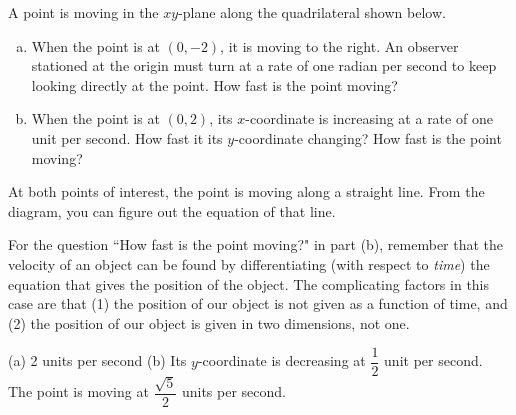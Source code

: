 \begin{question}
A point is moving in the $xy$-plane along the quadrilateral shown below.
\begin{center}\end{center}
\begin{enumerate}[(a)]
\item When the point is at $(0,-2)$, it is moving to the right. An observer stationed at the origin must turn at a rate of one radian per second to keep looking directly at the point. How fast is the point moving?
\item When the point is at $(0,2)$, its $x$-coordinate is increasing at a rate of one unit per second. How fast it its $y$-coordinate changing? How fast is  the point moving?
\end{enumerate}
\end{question}
\begin{hint}
At both points of interest, the point is moving along  a straight line. From the diagram, you can figure out the equation of that line.

For the question ``How fast is the point moving?" in part (b), remember that the velocity of an object can be found by differentiating  (with respect to \emph{time}) the equation that gives the position of the object. The complicating factors in this case are that (1) the position of our object is not given as a function of time, and (2) the position of our object is given in two dimensions, not one.
\end{hint}
\begin{answer}
(a) 2 units per second
(b)
Its $y$-coordinate is decreasing at $\dfrac{1}{2}$ unit per second.\\
The point is moving at $\dfrac{\sqrt{5}}{2}$ units per second.
\end{answer}
